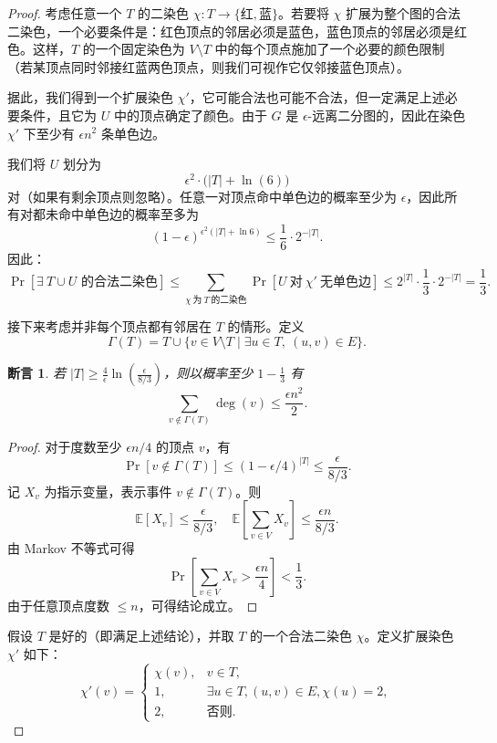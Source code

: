 \documentclass[lang=cn,newtx,10pt,scheme=chinese,chinesefont=nofont,citestyle=gb7714-2015, bibstyle=gb7714-2015]{elegantbook}
\newtheorem{claim}{断言}[chapter]   %
\begin{document}
\begin{refsection}
\begin{proof}
考虑任意一个 $T$ 的二染色 $\chi : T \to \{\text{红}, \text{蓝}\}$。若要将 $\chi$ 扩展为整个图的合法二染色，一个必要条件是：红色顶点的邻居必须是蓝色，蓝色顶点的邻居必须是红色。这样，$T$ 的一个固定染色为 $V \setminus T$ 中的每个顶点施加了一个必要的颜色限制（若某顶点同时邻接红蓝两色顶点，则我们可视作它仅邻接蓝色顶点）。

据此，我们得到一个扩展染色 $\chi'$，它可能合法也可能不合法，但一定满足上述必要条件，且它为 $U$ 中的顶点确定了颜色。由于 $G$ 是 $\epsilon$-远离二分图的，因此在染色 $\chi'$ 下至少有 $\epsilon n^2$ 条单色边。

我们将 $U$ 划分为
$$
\epsilon^2 \cdot \big(|T| + \ln(6)\big)
$$
对（如果有剩余顶点则忽略）。任意一对顶点命中单色边的概率至少为 $\epsilon$，因此所有对都未命中单色边的概率至多为
$$
(1 - \epsilon)^{\epsilon^2 (|T| + \ln 6)} \le \frac{1}{6} \cdot 2^{-|T|}.
$$
因此：
$$
\Pr[\exists\ \text{$T \cup U$ 的合法二染色}] \le
\sum_{\chi \ \text{为}\ T\ \text{的二染色}} \Pr[U\ \text{对}\ \chi' \ \text{无单色边}]
\le 2^{|T|} \cdot \frac{1}{3} \cdot 2^{-|T|} = \frac{1}{3}.
$$

接下来考虑并非每个顶点都有邻居在 $T$ 的情形。定义
$$
\Gamma(T) = T \cup \{ v \in V \setminus T \mid \exists u \in T,\ (u,v) \in E \}.
$$

\begin{claim}
若 $|T| \ge \frac{4}{\epsilon} \ln\!\left( \frac{\epsilon}{8/3} \right)$，则以概率至少 $1 - \frac13$ 有
$$
\sum_{v \notin \Gamma(T)} \deg(v) \le \frac{\epsilon n^2}{2}.
$$
\end{claim}

\begin{proof}
对于度数至少 $\epsilon n/4$ 的顶点 $v$，有
$$
\Pr[v \notin \Gamma(T)] \le (1 - \epsilon/4)^{|T|} \le \frac{\epsilon}{8/3}.
$$
记 $X_v$ 为指示变量，表示事件 $v \notin \Gamma(T)$。则
$$
\mathbb{E}[X_v] \le \frac{\epsilon}{8/3}, \quad
\mathbb{E}\left[ \sum_{v \in V} X_v \right] \le \frac{\epsilon n}{8/3}.
$$
由 Markov 不等式可得
$$
\Pr\left[ \sum_{v \in V} X_v > \frac{\epsilon n}{4} \right] < \frac13.
$$
由于任意顶点度数 $\le n$，可得结论成立。
\end{proof}


假设 $T$ 是好的（即满足上述结论），并取 $T$ 的一个合法二染色 $\chi$。定义扩展染色 $\chi'$ 如下：
$$
\chi'(v) =
\begin{cases}
\chi(v), & v \in T, \\
1, & \exists u \in T, (u,v) \in E, \chi(u) = 2, \\
2, & \text{否则}.
\end{cases}
$$


\end{proof}
\end{refsection}
\end{document}
